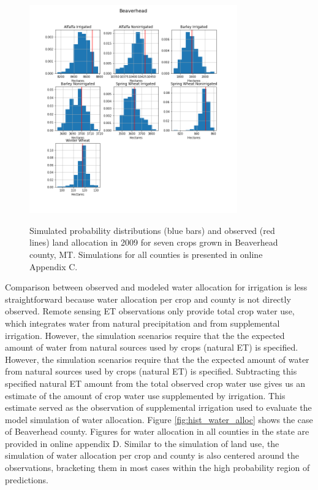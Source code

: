 \begin{figure}
\includegraphics[width=0.8\textwidth]{Figures/30001_hist_2008.png}
\label{fig:hist_land_alloc}
\caption{Simulated probability distributions (blue bars) and observed (red lines) land allocation in 2009 for seven crops grown in Beaverhead county, MT. Simulations for all counties is presented in online Appendix C.}
\end{figure}

Comparison between observed and modeled water allocation for irrigation is less straightforward because water allocation per crop and county is not directly observed. Remote sensing ET observations only provide total crop water use, which integrates water from natural precipitation and from supplemental irrigation. However, the simulation scenarios require that the the expected amount of water from natural sources used by crops (natural ET) is specified.  However, the simulation scenarios require that the the expected amount of water from natural sources used by crops (natural ET) is specified. Subtracting this specified natural ET amount from the total observed crop water use gives us an estimate of the amount of crop water use supplemented by irrigation. This estimate served as the observation of supplemental irrigation used to evaluate the model simulation of water allocation.  Figure \ref{fig:hist_water_alloc} shows the case of Beaverhead county. Figures for water allocation in all counties in the state are provided in online appendix D. Similar to the simulation of land use, the simulation of water allocation per crop and county is also centered around the observations, bracketing them in most cases within the high probability region of predictions.   

